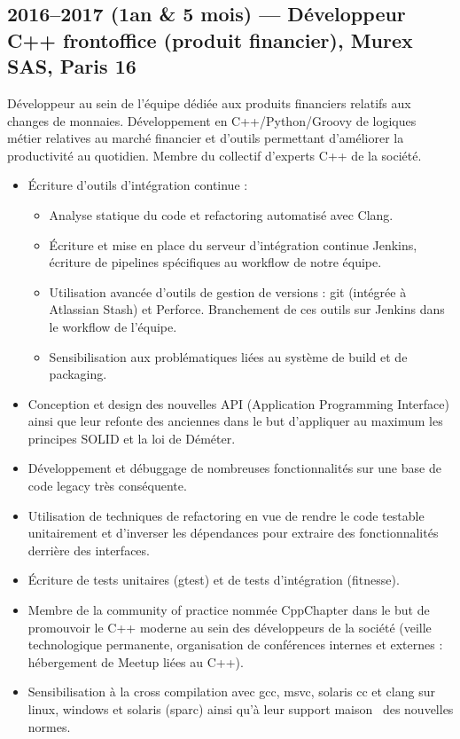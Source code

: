\documentclass[11pt,a4paper,sans]{article} %
\begin{document}
\subsection{2016--2017 (1an \& 5 mois) --- Développeur C++ frontoffice (produit financier), Murex SAS, Paris 16}

Développeur au sein de l'équipe dédiée aux produits financiers relatifs aux changes de monnaies. Développement en
C++/Python/Groovy de logiques métier relatives au marché financier et d'outils permettant d'améliorer la productivité au
quotidien. Membre du collectif d'experts C++ de la société.
\begin{itemize}
  \item Écriture d'outils d'intégration continue :
        \begin{itemize}
          \item Analyse statique du code et refactoring automatisé avec Clang.
          \item Écriture et mise en place du serveur d'intégration continue Jenkins, écriture de pipelines spécifiques
                au workflow de notre équipe.
          \item Utilisation avancée d'outils de gestion de versions : git (intégrée à Atlassian Stash) et Perforce.
                Branchement de ces outils sur Jenkins dans le workflow de l'équipe.
          \item Sensibilisation aux problématiques liées au système de build et de packaging.
        \end{itemize}
  \item Conception et design des nouvelles API (Application Programming Interface) ainsi que leur refonte des anciennes
        dans le but d'appliquer au maximum les principes SOLID et la loi de Déméter.
  \item Développement et débuggage de nombreuses fonctionnalités sur une base de code legacy très conséquente.
  \item Utilisation de techniques de refactoring en vue de rendre le code testable unitairement et d'inverser les
        dépendances pour extraire des fonctionnalités derrière des interfaces.
  \item Écriture de tests unitaires (gtest) et de tests d'intégration (fitnesse).
  \item Membre de la \og community of practice \fg nommée CppChapter dans le but de promouvoir le C++ moderne au sein
        des développeurs de la société (veille technologique permanente, organisation de conférences internes et
        externes : hébergement de Meetup liées au C++).
  \item Sensibilisation à la cross compilation avec gcc, msvc, solaris cc et clang sur linux, windows et solaris (sparc)
        ainsi qu'à leur support \og maison \fg ~des nouvelles normes.
\end{itemize}
\end{document}
